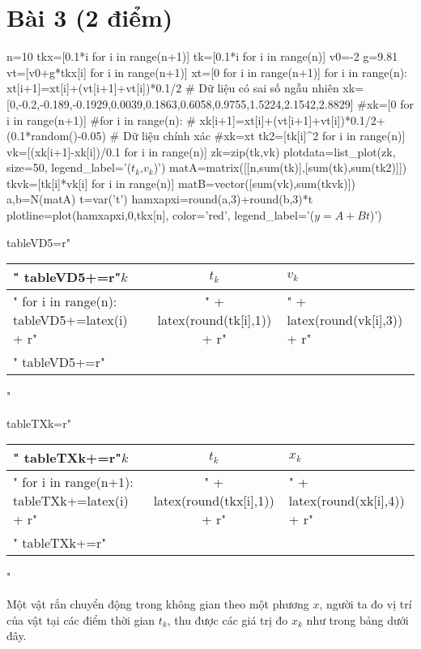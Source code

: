 \documentclass[12pt]{article}
\begin{document}
\section{Bài 3 (2 điểm)}


\begin{sagesilent}
n=10
tkx=[0.1*i for i in range(n+1)]
tk=[0.1*i for i in range(n)]
v0=-2
g=9.81
vt=[v0+g*tkx[i] for i in range(n+1)]
xt=[0 for i in range(n+1)]
for i in range(n):
 xt[i+1]=xt[i]+(vt[i+1]+vt[i])*0.1/2
# Dữ liệu có sai số ngẫu nhiên
xk=[0,-0.2,-0.189,-0.1929,0.0039,0.1863,0.6058,0.9755,1.5224,2.1542,2.8829]
#xk=[0 for i in range(n+1)]
#for i in range(n):
# xk[i+1]=xt[i]+(vt[i+1]+vt[i])*0.1/2+(0.1*random()-0.05)
# Dữ liệu chính xác
#xk=xt
tk2=[tk[i]^2 for i in range(n)]
vk=[(xk[i+1]-xk[i])/0.1 for i in range(n)]
zk=zip(tk,vk)
plotdata=list_plot(zk, size=50, legend_label='($t_k$,$v_k$)')
matA=matrix([[n,sum(tk)],[sum(tk),sum(tk2)]])
tkvk=[tk[i]*vk[i] for i in range(n)]
matB=vector([sum(vk),sum(tkvk)])
a,b=N(matA\matB)
t=var('t')
hamxapxi=round(a,3)+round(b,3)*t
plotline=plot(hamxapxi,0,tkx[n], color='red', legend_label='($y=A+Bt$)')

tableVD5=r"\begin{tabular}{l|c|l}"
tableVD5+=r"$k$ & $t_k$ & $v_k$ \\ \hline"
for i in range(n):
  tableVD5+=latex(i) + r"&" + latex(round(tk[i],1)) + r"&" + latex(round(vk[i],3)) + r"\\"
tableVD5+=r"\end{tabular}"

tableTXk=r"\begin{tabular}{l|c|l}"
tableTXk+=r"$k$ & $t_k$ & $x_k$ \\ \hline"
for i in range(n+1):
  tableTXk+=latex(i) + r"&" + latex(round(tkx[i],1)) + r"&" + latex(round(xk[i],4)) + r"\\"
tableTXk+=r"\end{tabular}"

\end{sagesilent}

Một vật rắn chuyển động trong không gian theo một phương $x$, người ta đo vị trí của vật tại các điểm thời gian $t_k$, thu được các giá trị đo $x_k$ như trong bảng dưới đây.
\end{document}

